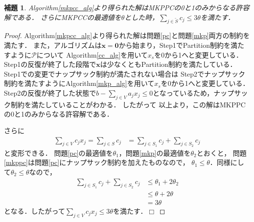 \documentclass[11pt,dvipdfmx]{jarticle}
\def\qed{\hfill $\Box$}
\numberwithin{equation}{section}
\newtheorem{lem}{補題}[section]
\newtheorem{proof}{証明}
\begin{document}
        \begin{lem}
            \rm Algorithm\ref{mkpcc_alg}より得られた解はMKPPCの0と1のみからなる許容解である．
            さらにMKPCCの最適値を$\theta$とした時，$\sum_{j\in \tilde{S}}{c_j}\le3\theta$を満たす．
        \label{lem2}
        \end{lem}
        \begin{proof}
            \rm Algorithm\ref{mkpcc_alg}より得られた解は問題\eqref{pc}と問題\eqref{mkp}両方の制約を満たす．
            また，アルゴリズムは$\bm{x}=\bm{0}$から始まり，Step1でPartition制約を満たすように$\mathcal{P}$について
            Algorithm\ref{cc_alg}を用いて$x_s$を0から1へと変更している．Step1の反復が終了した段階で$\bm{x}$は少なくともPartition制約を満たしている．
            Step1での変更でナップサック制約が満たされない場合は
            Step2でナップサック制約を満たすようにAlgorithm\ref{mkp_alg}を用いて$x_s$を0から1へと変更している．
            Step2の反復が終了した状態で$b-\sum_{j\in V}{a_jx_j}\le 0$となっているため，ナップサック制約を満たしていることがわかる．
            したがって
            以上より，この解はMKPPCの0と1のみからなる許容解である．\par
            さらに
            \begin{align}
                \sum_{j\in V}{c_jx_j}=\sum_{j\in S}{c_j}&=\sum_{j\in S_1}{c_j}+\sum_{j\in S_2}{c_j}
                \label{p1}
            \end{align}
            と変形できる．
            問題\eqref{pc}の最適値を$\theta_1$，問題\eqref{mkp}の最適値を$\theta_2$とおくと，
            問題\eqref{mkppc}は問題\eqref{pc}にナップサック制約を加えたものなので，
            $\theta_1\le\theta$．同様にして$\theta_2\le\theta$なので，
            \begin{align}    
                \sum_{j\in S_1}{c_j}+\sum_{j\in S_2}{c_j}  &\le \theta_1 + 2\theta_2\\
                &\le \theta + 2\theta\\
                &=3\theta
                \label{p2}
            \end{align}
            となる．したがって$\sum_{j\in V}{c_jx_j}\le3\theta$を満たす．\qed
        \end{proof}
        
\end{document}

